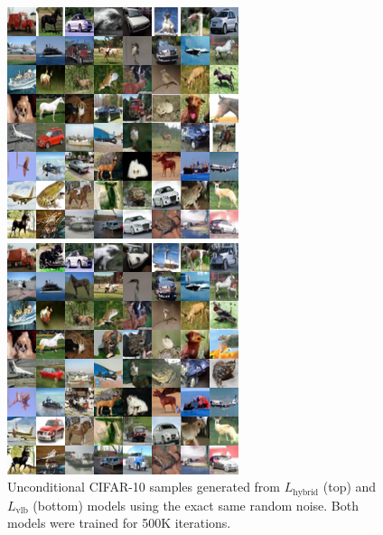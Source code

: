 \documentclass{article}
\begin{document}
\begin{figure}[t]
    \centering
    \centerline{\includegraphics[width=0.78\columnwidth]{samples_cifar_hybrid.png}}
    \vskip 0.1in
    \centerline{\includegraphics[width=0.78\columnwidth]{samples_cifar_vlb.png}}
    \caption{\label{fig:uncondvlbcomparison_cifar} Unconditional CIFAR-10 samples generated from $L_{\text{hybrid}}$ (top) and $L_{\text{vlb}}$ (bottom) models using the exact same random noise. Both models were trained for 500K iterations.}
\end{figure}
\end{document}

